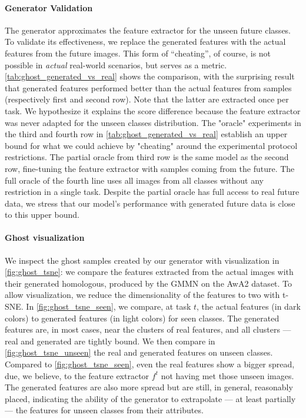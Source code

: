 \paragraph{Generator Validation} The generator approximates the feature extractor for the unseen
future classes. To validate its effectiveness, we replace the generated features with the actual
features from the future images. This form of “cheating”, of course, is not possible in
\textit{actual} real-world scenarios, but serves as a metric. \autoref{tab:ghost_generated_vs_real}
shows the comparison, with the surprising result that generated features performed better than the
actual features from samples (respectively first and second row). Note that the latter are extracted
once per task. We hypothesize it explains the score difference because the feature extractor was
never adapted for the unseen classes distribution. The "oracle" experiments in the third and fourth
row in \autoref{tab:ghost_generated_vs_real} establish an upper bound for what we could achieve by
"cheating" around the experimental protocol restrictions. The partial oracle from third row is the
same model as the second row, fine-tuning the feature extractor with samples coming from the future.
The full oracle of the fourth line uses all images from all classes without any restriction in a
single task. Despite the partial oracle has full access to real future data, we stress that our
model's performance with generated future data is close to this upper bound.




\paragraph{Ghost visualization} We inspect the ghost samples created by our generator with
visualization in \autoref{fig:ghost_tsne}: we compare the features extracted from the actual images
with their generated homologous, produced by the GMMN on the AwA2 dataset. To allow visualization,
we reduce the dimensionality of the features to two with t-SNE. In \autoref{fig:ghost_tsne_seen}, we
compare, at task $t$, the actual features (in dark colors) to generated features (in light colors)
for seen classes. The generated features are, in most cases, near the clusters of real features, and
all clusters — real and generated are tightly bound. We then compare in
\autoref{fig:ghost_tsne_unseen} the real and generated features on unseen classes. Compared to
\autoref{fig:ghost_tsne_seen}, even the real features show a bigger spread, due, we believe, to the
feature extractor $f^t$ not having met those unseen images. The generated features are also more
spread but are still, in general, reasonably placed, indicating the ability of the generator to
extrapolate — at least partially — the features for unseen classes from their attributes.

